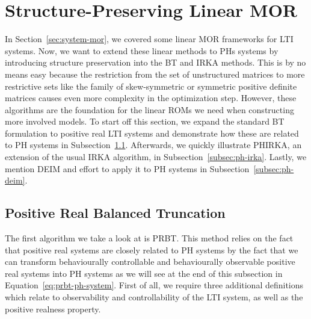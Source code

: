 \section{Structure-Preserving Linear MOR}\label{sec:structure-preserving-mor}

In Section~\ref{sec:system-mor}, we covered some linear \ac{MOR} frameworks for \ac{LTI} systems.
Now, we want to extend these linear methods to \acp{PH} systems by introducing structure preservation into the \ac{BT} and \ac{IRKA} methods.
This is by no means easy because the restriction from the set of unstructured matrices to more restrictive sets like the family of skew-symmetric or symmetric positive definite matrices causes even more complexity in the optimization step.
However, these algorithms are the foundation for the linear \acp{ROM} we need when constructing more involved models.
To start off this section, we expand the standard \ac{BT} formulation to positive real \ac{LTI} systems and demonstrate how these are related to \ac{PH} systems in Subsection~\ref{subsec:prbt}.
Afterwards, we quickly illustrate \ac{PHIRKA}, an extension of the usual \ac{IRKA} algorithm, in Subsection~\ref{subsec:ph-irka}.
Lastly, we mention \ac{DEIM} and effort to apply it to \ac{PH} systems in Subsection~\ref{subsec:ph-deim}.

\subsection{Positive Real Balanced Truncation}\label{subsec:prbt}

The first algorithm we take a look at is \acf{PRBT}.
This method relies on the fact that positive real systems are closely related to \ac{PH} systems by the fact that we can transform behaviourally controllable and behaviourally observable positive real systems into \ac{PH} systems as we will see at the end of this subsection in Equation~\eqref{eq:prbt-ph-system}.
First of all, we require three additional definitions which relate to observability and controllability of the \ac{LTI} system, as well as the positive realness property.

